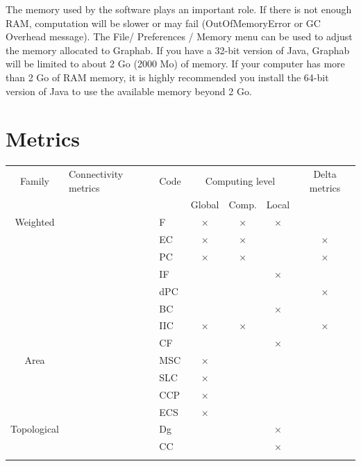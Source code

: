 \documentclass{article}
\begin{document}
The memory used by the software plays an important role. If there is not enough RAM, computation will be slower or may fail (OutOfMemoryError or GC Overhead message). The File/ Preferences / Memory menu can be used to adjust the memory allocated to Graphab. If you have a 32-bit version of Java, Graphab will be limited to about 2 Go (2000 Mo) of memory. If your computer has more than 2 Go of RAM memory, it is highly
recommended you install the 64-bit version of Java to use the available memory beyond 2 Go.


\section{Metrics}


\begin{table}[H]
\begin{tabular}{|c|l|l|c|c|c|c|}
	\hline
	Family & Connectivity metrics & Code & \multicolumn{3}{m{3.6cm}|}{\centering Computing level} & Delta metrics\\
	\hhline{~~~---~}
	& & & Global & Comp. & Local &\\
	\hline
	Weighted
	& \nameref{metric_F} & F & × & × & × &\\
	\hhline{~------}
	& \nameref{metric_EC} & EC & × & × &  & ×\\
	\hhline{~------}
	& \nameref{metric_PC} & PC & × & × &  & ×\\
	\hhline{~------}
	& \nameref{metric_IF}  & IF &  &  & × &\\
	\hhline{~------}
	& \nameref{metric_dPC} & dPC &  &  &  & ×\\
	\hhline{~------} 
	& \nameref{metric_BC} & BC &  &  & × & \\
	\hhline{~------}
	& \nameref{metric_IIC} & IIC & × & × &  & × \\
	\hhline{~------}	
	& \nameref{metric_CF} & CF &  &  & × & \\
	\hline
	Area
	& \nameref{metric_MSC} & MSC & × &  &  & \\
	\hhline{~------}
	& \nameref{metric_SLC} & SLC & × &  &  & \\
	\hhline{~------}
	& \nameref{metric_CCP} & CCP & × &  &  & \\
	\hhline{~------}
	& \nameref{metric_ECS} & ECS & × &  &  & \\
	\hline
	Topological
	& \nameref{metric_Dg} & Dg &  &  & × & \\
	\hhline{~------}
	& \nameref{metric_CC}  & CC &  &  & × & \\
	\hhline{~------}

\end{tabular}
\end{table}
\end{document}

